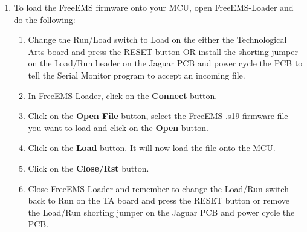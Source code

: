 \documentclass[12pt,notitlepage,onecolumn,oneside,openany]{memoir}
\begin{document}
\begin{enumerate}
\item \textsf{To load the FreeEMS firmware onto your MCU, open FreeEMS-Loader and do the following:}
      \begin{enumerate}
      \item \textsf{Change the Run/Load switch to Load on the either the Technological Arts board and press the RESET button OR install the shorting jumper on the Load/Run header on the Jaguar PCB and power cycle the PCB to tell the Serial Monitor program to accept an incoming file.} 
      \item \textsf{In FreeEMS-Loader, click on the \textbf{Connect} button.}
      \item \textsf{Click on the \textbf{Open File} button, select the FreeEMS .s19 firmware file you want to load and click on the \textbf{Open} button.}
      \item \textsf{Click on the \textbf{Load} button.  It will now load the file onto the MCU.}
      \item \textsf{Click on the \textbf{Close/Rst} button.}
      \item \textsf{Close FreeEMS-Loader and remember to change the Load/Run switch back to Run on the TA board and press the RESET button or remove the Load/Run shorting jumper on the Jaguar PCB and power cycle the PCB.}
      \end{enumerate}
\end{enumerate}
\end{document}
